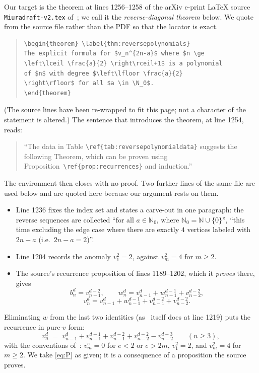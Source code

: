 \documentclass[11pt]{amsart}
\newtheorem{theorem}{Theorem}
\theoremstyle{remark}
\newcommand{\N}{\mathbb{N}}
\begin{document}
Our target is the theorem at lines 1256--1258 of the arXiv e-print \LaTeX{}
source \texttt{Miuradraft-v2.tex} of~\cite{CHOPTY}; we call it the
\emph{reverse-diagonal theorem}
below. We quote from the source file rather than the PDF so that the locator is
exact.

\begin{quote}\footnotesize
\begin{verbatim}
\begin{theorem} \label{thm:reversepolynomials}
The explicit formula for $v_n^{2n-a}$ where $n \ge
\left\lceil \frac{a}{2} \right\rceil+1$ is a polynomial
of $n$ with degree $\left\lfloor \frac{a}{2}
\right\rfloor$ for all $a \in \N_0$.
\end{theorem}
\end{verbatim}
\end{quote}

\noindent
(The source lines have been re-wrapped to fit this page; not a character of
the statement is altered.) The sentence that introduces the theorem, at line
1254, reads:

\begin{quote}
``The data in Table \texttt{\textbackslash ref\{tab:reversepolynomialdata\}}
suggests the following Theorem, which can be proven using
Proposition~\texttt{\textbackslash ref\{prop:recurrences\}} and induction.''
\end{quote}

\noindent
The environment then closes with no proof. Two further lines of the same file
are used below and are quoted here because our argument rests on them.

\begin{itemize}
\item Line 1236 fixes the index set and states a carve-out in one paragraph:
the reverse sequences are collected ``for all $a \in \N_0$, where
$\N_0=\N\cup\{0\}$'', ``this time excluding the edge case where there are
exactly $4$ vertices labeled with $2n-a$ (i.e.\ $2n-a=2$)''.
\item Line 1204 records the anomaly $v_1^2=2$, against $v_m^2=4$ for $m\ge2$.
\item The source's recurrence proposition of lines 1189--1202, which it
\emph{proves} there, gives
\[
 b_n^d=v_{n-1}^{d-2},\qquad
 w_n^d=v_{n-1}^{d}+w_{n-1}^{d-1}+v_{n-2}^{d-2},
\]
\[
 v_n^d=v_{n-1}^{d}+w_{n-1}^{d-1}+v_{n-1}^{d-2}+v_{n-2}^{d-2}.
\]
\end{itemize}

\noindent
Eliminating $w$ from the last two identities (as~\cite{CHOPTY} itself does at
line 1219) puts the recurrence in pure-$v$ form:
\begin{equation}\label{eq:P}
  v_n^d \;=\; v_{n-1}^{d}+v_{n-1}^{d-1}+v_{n-1}^{d-2}
            +v_{n-2}^{d-2}-v_{n-2}^{d-3}
  \qquad (n\ge 3),
\end{equation}
with the conventions of~\cite{CHOPTY}: $v_m^e=0$ for $e<2$ or $e>2m$,
$v_1^2=2$, and $v_m^2=4$ for $m\ge2$. We take
\eqref{eq:P} as given; it is a consequence of a proposition the source proves.
\end{document}
